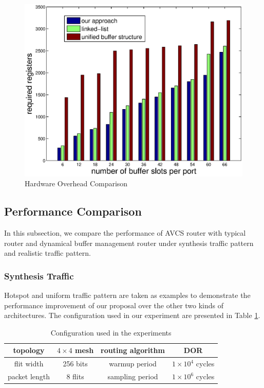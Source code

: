\documentclass[paper]{ieice}
\begin{document}
\begin{figure}[h]
  \centering
  \includegraphics[scale=0.45]{figures/bufcmp2.eps}
  \caption{Hardware Overhead Comparison}\label{bufcmp2}
\end{figure}

\subsection{Performance Comparison}
In this subsection, we compare the performance of AVCS router with typical router \cite{DaTo01} and dynamical buffer management router \cite{NPKV06}\cite{4555894} under synthesis traffic pattern and realistic traffic pattern.
\subsubsection{Synthesis Traffic}
Hotspot and uniform traffic pattern are taken as examples to demonstrate the performance improvement of our proposal over the other two kinds of architectures. The configuration used in our experiment are presented in Table \ref{config}.
\begin{table}[htbp]
\centering
\caption{\label{arcpara}Configuration used in the experiments}\label{config}
\begin{tabular}{|c|c||c|c|}
\hline
topology    & $4\times 4$ mesh  &   routing algorithm & DOR\\
\hline
flit width   & 256 bits & warmup period &   $1\times 10^4$ cycles\\
\hline
packet length & 8 flits & sampling period &   $1\times 10^6$ cycles\\
\hline
\end{tabular}
\end{table}
\end{document}
